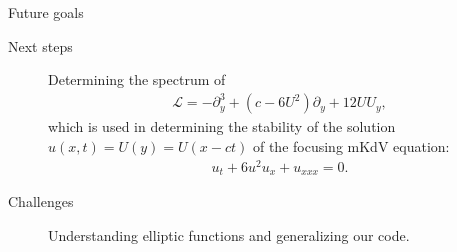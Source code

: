 \documentclass{beamer}
\begin{document}
\begin{frame}{Future goals}

\begin{description}

\item[Next steps] Determining the spectrum of 
\begin{align*}
\mathcal{L} = -\partial_{y}^3 + (c - 6U^2)\partial_y + 12 U U_y,
\end{align*}
which is used in determining the stability of the solution $u(x,t) = U(y) = U(x-ct)$ of the focusing mKdV equation:
\begin{align*}
u_t + 6u^2 u_x + u_{xxx} = 0.
\end{align*}

\item[Challenges] Understanding elliptic functions and generalizing our code.

\end{description}

\end{frame}
\end{document}
